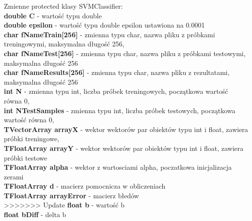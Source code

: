 \documentclass[[10pt,a4paper]{article}
\begin{document}
\begin{enumerate}
\begin{itemize}
Zmienne protected klasy SVMClassifier:\\
\textbf{double C} - wartość typu double\\
\textbf{double epsilon} - wartość typu double epsilon ustawiona na 0.0001\\
\textbf{char fNameTrain[256]} - zmienna typu char, nazwa pliku z próbkami treningowymi, maksymalna długość 256,\\
\textbf{char fNameTest[256]} -  zmienna typu char, nazwa pliku z próbkami testowymi, maksymalna długość 256\\
\textbf{char fNameResults[256]} -  zmienna typu char, nazwa pliku z rezultatami, maksymalna długość 256\\  
\textbf{int N }- zmienna typu int, liczba próbek treningowych, początkowa wartość równa 0,\\
\textbf{int NTestSamples} - zmienna typu int, liczba próbek testowych, początkowa wartość równa 0,\\
\textbf{TVectorArray arrayX} - wektor wektorów par obiektów typu int i float, zawiera próbki treningowe,\\
\textbf{TFloatArray arrayY }- wektor wektorów par obiektów typu int i float, zawiera próbki testowe\\
\textbf{TFloatArray alpha} - wektor z wartosciami alpha, poczatkowa inicjalizacja zerami\\
\textbf{TFloatArray d }- macierz pomocnicza w obliczeniach\\
\textbf{TFloatArray arrayError }- macierz błedów \\
>>>>>>> Update
\textbf{float b }- wartość b\\
\textbf{float bDiff }- delta b\\


\end{itemize}
\end{enumerate}
\end{document}

